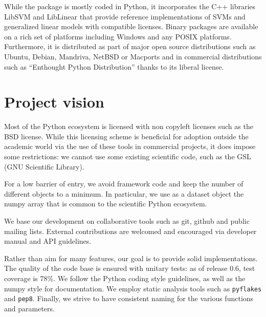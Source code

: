 \documentclass[twoside,11pt]{article}
\begin{document}
While the package is mostly coded in Python, it incorporates the C++
libraries LibSVM \citep{chang2001} and LibLinear \citep{fan2008} that
provide reference implementations of SVMs and generalized linear models
with compatible licenses.
%
Binary packages are available on a rich set of platforms including
Windows and any POSIX platforms. Furthermore, it is distributed as part
of major open source distributions such as Ubuntu, Debian, Mandriva,
NetBSD or Macports and in commercial distributions such as ``Enthought
Python Distribution'' thanks to its liberal license.




\section {Project vision}

%
Most of the Python ecosystem is licensed with non copyleft licenses such
as the BSD license. While this licensing scheme is beneficial for adoption
outside the academic world via the use of these tools in commercial
projects, it does impose some restrictions: we cannot use some existing
scientific code, such as the GSL (GNU Scientific Library).

\smallskip {}
%
For a low barrier of entry, we avoid framework code and keep the number
of different objects to a minimum. In particular, we use as a dataset
object the numpy array \citep{Vanderwalt2011} that is common to the
scientific Python ecosystem.

\smallskip
{}
%
We base our development on collaborative tools such as git, github and
public mailing lists. External contributions are welcomed and
encouraged via developer manual and API guidelines.

\smallskip {}
%
Rather than aim for many features, our goal is to provide solid
implementations. The quality of the code base is ensured with unitary
tests: as of release 0.6, test coverage is 78\%. We follow the Python
coding style guidelines, as well as the numpy style for documentation. We
employ static analysis tools such as {\tt pyflakes} and {\tt pep8}.
Finally, we strive to have consistent naming for the various functions
and parameters.
\end{document}
